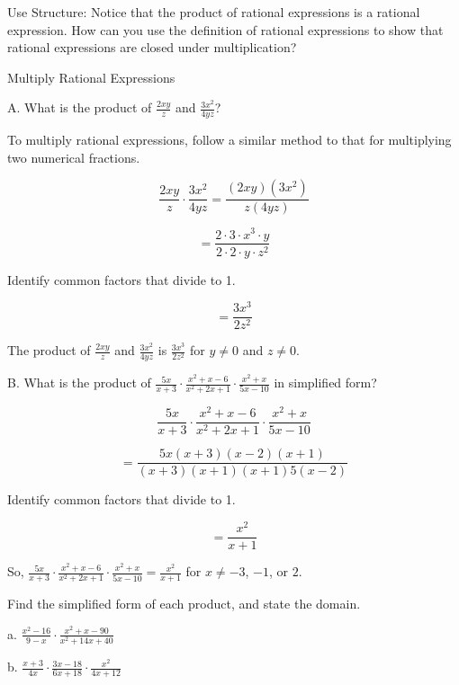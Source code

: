 \documentclass{article}
\newenvironment{concept-box}{}{}        %
\newenvironment{example}[1]{}{}         %
\newenvironment{tryit}[1]{}{}           %
\newcommand{\answer}[1]{}               %
\begin{document}
\begin{concept-box}
Use Structure: Notice that the product of rational expressions is a rational expression. How can you use the definition of rational expressions to show that rational expressions are closed under multiplication?
\end{concept-box}

\begin{example}{3}
Multiply Rational Expressions

A. What is the product of \(\frac{2xy}{z}\) and \(\frac{3x^2}{4yz}\)?

To multiply rational expressions, follow a similar method to that for multiplying two numerical fractions.

\[
\frac{2xy}{z}\cdot\frac{3x^2}{4yz}
=
\frac{(2xy)(3x^2)}{z(4yz)}
\]

\[
=
\frac{2\cdot 3\cdot x^3\cdot y}{2\cdot 2\cdot y\cdot z^2}
\]

Identify common factors that divide to 1.

\[
=
\frac{3x^3}{2z^2}
\]

The product of \(\frac{2xy}{z}\) and \(\frac{3x^2}{4yz}\) is \(\frac{3x^3}{2z^2}\) for \(y\ne 0\) and \(z\ne 0\).

B. What is the product of \(\frac{5x}{x+3}\cdot\frac{x^2+x-6}{x^2+2x+1}\cdot\frac{x^2+x}{5x-10}\) in simplified form?

\[
\frac{5x}{x+3}\cdot\frac{x^2+x-6}{x^2+2x+1}\cdot\frac{x^2+x}{5x-10}
\]

\[
=
\frac{5x(x+3)(x-2)(x+1)}{(x+3)(x+1)(x+1)5(x-2)}
\]

Identify common factors that divide to 1.

\[
=
\frac{x^2}{x+1}
\]

So, \(\frac{5x}{x+3}\cdot\frac{x^2+x-6}{x^2+2x+1}\cdot\frac{x^2+x}{5x-10}=\frac{x^2}{x+1}\) for \(x\ne -3\), \(-1\), or \(2\).

\answer{A. \(\frac{3x^3}{2z^2}\), for \(y\ne0\) and \(z\ne0\). B. \(\frac{x^2}{x+1}\), for \(x\ne -3,-1,\text{ or }2\).}
\end{example}

\begin{tryit}{3}
Find the simplified form of each product, and state the domain.

a. \(\frac{x^2-16}{9-x}\cdot\frac{x^2+x-90}{x^2+14x+40}\)

b. \(\frac{x+3}{4x}\cdot\frac{3x-18}{6x+18}\cdot\frac{x^2}{4x+12}\)

\answer{a. \(-(x-4)\) for all \(x\) except \(9\), \(-10\), and \(-4\). b. \(\frac{x(x-6)}{32(x+3)}\) for all \(x\) except \(0\) and \(-3\).}
\end{tryit}
\end{document}
